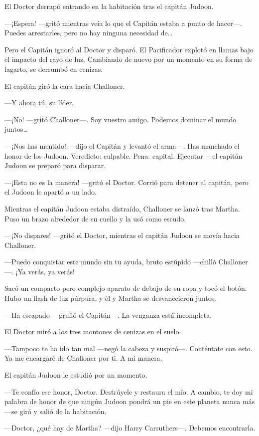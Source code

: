 El Doctor derrapó entrando en la habitación tras el capitán Judoon.

---¡Espera! ---gritó mientras veía lo que el Capitán estaba a punto de
hacer---. Puedes arrestarles, pero no hay ninguna necesidad de\ldots{}

Pero el Capitán ignoró al Doctor y disparó. El Pacificador explotó en
llamas bajo el impacto del rayo de luz. Cambiando de nuevo por un
momento en su forma de lagarto, se derrumbó en cenizas.

El capitán giró la cara hacia Challoner.

---Y ahora tú, su líder.

---¡No! ---gritó Challoner---. Soy vuestro amigo. Podemos dominar el
mundo juntos\ldots{}

---¡Nos has mentido! ---dijo el Capitán y levantó el arma---. Has
manchado el honor de los Judoon. Veredicto: culpable. Pena: capital.
Ejecutar ---el capitán Judoon se preparó para disparar.

---¡Esta no es la manera! ---gritó el Doctor. Corrió para detener al
capitán, pero el Judoon le apartó a un lado.

Mientras el capitán Judoon estaba distraído, Challoner se lanzó tras
Martha. Puso un brazo alrededor de su cuello y la usó como escudo.

---¡No dispares! ---gritó el Doctor, mientras el capitán Judoon se movía
hacia Challoner.

---Puedo conquistar este mundo sin tu ayuda, bruto estúpido ---chilló
Challoner---. ¡Ya verás, ya verás!

Sacó un compacto pero complejo aparato de debajo de su ropa y tocó el
botón. Hubo un flash de luz púrpura, y él y Martha se desvanecieron
juntos.

---Ha escapado ---gruñó el Capitán---. La venganza está incompleta.

El Doctor miró a los tres montones de cenizas en el suelo.

---Tampoco te ha ido tan mal ---negó la cabeza y suspiró---. Conténtate
con esto. Ya me encargaré de Challoner por ti. A mi manera.

El capitán Judoon le estudió por un momento.

---Te confío ese honor, Doctor. Destrúyele y restaura el mío. A cambio,
te doy mi palabra de honor de que ningún Judoon pondrá un pie en este
planeta nunca más ---se giró y salió de la habitación.

---Doctor, ¿qué hay de Martha? ---dijo Harry Carruthers---. Debemos
encontrarla.

